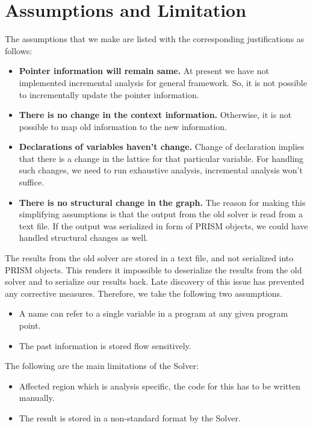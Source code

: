 \documentclass[11pt,a4paper,openright]{report}
\begin{document}
\section{Assumptions and Limitation }

The assumptions that we make are listed with the corresponding justifications as follows:
\begin{itemize}
\item \textbf{Pointer information will remain same.}
At present we have not implemented incremental analysis for general framework. So, it is not possible to incrementally update the pointer information.
\item \textbf{There is no change in the context information.}
Otherwise, it is not possible to map old information to the new information.

\item \textbf{Declarations of variables haven't change.}
Change of declaration implies that there is a change in the lattice for that particular variable. For handling such changes, we need to 
run exhaustive analysis, incremental analysis won't suffice.
\item \textbf{There is no structural change in the graph.}
The reason for making this simplifying assumptions is that the output from the old solver is read from a text file. If the output was
serialized in form of PRISM objects, we could have handled structural changes as well.


\end{itemize}


The results from the old solver are stored in a text file, and not serialized into PRISM objects.
This renders it impossible to deserialize the results from the old solver and to serialize our results back.
Late discovery of this issue has prevented any corrective measures. Therefore, we take the following two assumptions. 
\begin{itemize}
\item A name can refer to a single variable in a program at any given program point.
\item The past information is stored flow sensitively.
\end{itemize}


The following are the main limitations of the Solver:
\begin{itemize}
 \item Affected region which is analysis specific, the code for this has to be written manually.
 \item The result is stored in a non-standard format by the Solver.
 \end{itemize}
\end{document}
